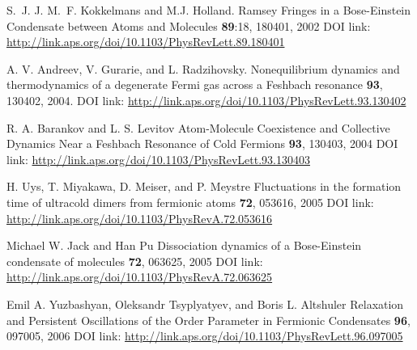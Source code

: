 \documentclass[a4paper,10pt]{article}
\begin{document}
\begin{thebibliography}{10}
S.~J. J. M.~F. Kokkelmans and M.J. Holland.
\newblock Ramsey Fringes in a {B}ose-{E}instein {C}ondensate between {A}toms and {M}olecules
 \textbf{89}:18, 180401, 2002
\newblock DOI link: \url{http://link.aps.org/doi/10.1103/PhysRevLett.89.180401}

A. V. Andreev, V. Gurarie, and L. Radzihovsky.
\newblock Nonequilibrium dynamics and thermodynamics of a degenerate Fermi gas across a Feshbach resonance
 \textbf{93}, 130402, 2004. 
\newblock DOI link: \url{http://link.aps.org/doi/10.1103/PhysRevLett.93.130402}

R. A. Barankov and L. S. Levitov 
\newblock Atom-Molecule Coexistence and Collective Dynamics Near a Feshbach Resonance of Cold Fermions
 \textbf{93}, 130403, 2004
\newblock DOI link: \url{http://link.aps.org/doi/10.1103/PhysRevLett.93.130403}

H. Uys, T. Miyakawa, D. Meiser, and P. Meystre 
\newblock Fluctuations in the formation time of ultracold dimers from fermionic atoms
 \textbf{72}, 053616, 2005
\newblock DOI link: \url{http://link.aps.org/doi/10.1103/PhysRevA.72.053616}

Michael W. Jack and Han Pu 
\newblock Dissociation dynamics of a Bose-Einstein condensate of molecules
 \textbf{72}, 063625, 2005
\newblock DOI link: \url{http://link.aps.org/doi/10.1103/PhysRevA.72.063625}

Emil A. Yuzbashyan, Oleksandr Tsyplyatyev, and Boris L. Altshuler
\newblock Relaxation and Persistent Oscillations of the Order Parameter in Fermionic Condensates
 \textbf{96}, 097005, 2006
\newblock DOI link: \url{http://link.aps.org/doi/10.1103/PhysRevLett.96.097005}




\end{thebibliography}
\end{document}

